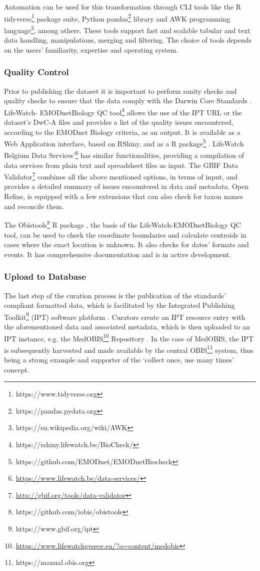 Automation can be used for this transformation through CLI tools like the R
tidyverse\footnote{https://www.tidyverse.org} package suite, Python
pandas\footnote{https://pandas.pydata.org} library and AWK programming
language\footnote{https://en.wikipedia.org/wiki/AWK}, among others. These tools
support fast and scalable tabular and text data handling, manipulations,
merging and filtering. The choice of tools depends on the users’ familiarity,
expertise and operating system.

   \subsubsection{Quality Control}
Prior to publishing the dataset it is important to perform sanity checks and
quality checks to ensure that the data comply with the Darwin Core
Standards \cite{vandepitte_fishing_2015}. LifeWatch- EMODnetBiology QC
tool\footnote{https://rshiny.lifewatch.be/BioCheck/} allows the use of the IPT
URL or the dataset’s DwC-A files and provides a list of the quality issues
encountered, according to the EMODnet Biology criteria, as an output. It is
available as a Web Application interface, based on RShiny, and as a R
package\footnote{https://github.com/EMODnet/EMODnetBiocheck} \cite{de_pooter_emodnetbiocheck_2019}.
LifeWatch Belgium Data Services’\footnote{\url{https://www.lifewatch.be/data-services/}}
has similar functionalities, providing a compilation of data services from
plain text and spreadsheet files as input. The GBIF Data
Validator\footnote{\url{http://gbif.org/tools/data-validator}} combines all the
above mentioned options, in terms of input, and provides a detailed summary of
issues encountered in data and metadata. Open Refine, is equipped with a few
extensions that can also check for taxon names and reconcile them.

The Obistools\footnote{https://github.com/iobis/obistools} R package \cite{provoost_iobisobistools_2019},
the basis of the LifeWatch-EMODnetBiology QC tool, can be used to check the
coordinate boundaries and calculate centroids in cases where the exact location
is unknown. It also checks for dates’ formats and events. It has comprehensive
documentation and is in active development.

   \subsubsection{Upload to Database}
The last step of the curation process is the publication of the standards’
compliant formatted data, which is facilitated by the Integrated Publishing
Toolkit\footnote{https://www.gbif.org/ipt} (IPT) software platform \cite{robertson_gbif_2014}.
Curators create an IPT resource entry with the aforementioned data and
associated metadata, which is then uploaded to an IPT instance, e.g. the
MedOBIS\footnote{\url{https://www.lifewatchgreece.eu/?q=content/medobis}}
Repository \cite{arvanitidis_medobis_2006}. In the case of MedOBIS, the IPT is
subsequently harvested and made available by the central OBIS\footnote{https://manual.obis.org}
system, thus being a strong example and supporter of the ‘collect once, use
many times’ concept.


